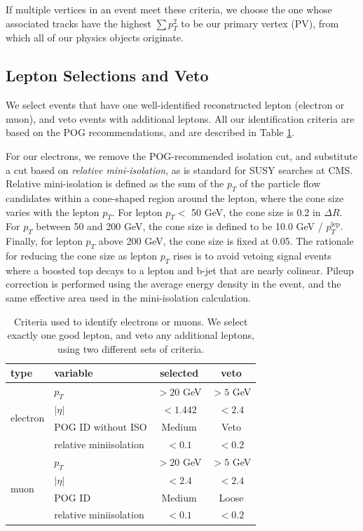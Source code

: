 If multiple vertices in an event meet these criteria, we choose the
one whose associated tracks have the highest $\sum p_T^2$ to be our
primary vertex (PV), from which all of our physics objects originate.

\subsection{Lepton Selections and Veto}
\label{ssec:stop:lepselections}

We select events that have one well-identified reconstructed lepton
(electron or muon), and veto events with additional leptons. All our
identification criteria are based on the POG recommendations, and are
described in Table \ref{tab:stop:lepselections}.

For our electrons, we remove the POG-recommended isolation cut, and
substitute a cut based on \emph{relative mini-isolation}, as is standard for
SUSY searches at CMS. Relative mini-isolation is defined as the sum of
the $p_T$ of the particle flow candidates within a cone-shaped region
around the lepton, where the cone size varies with the lepton
$p_T$. For lepton $p_T <$ 50 GeV, the cone size is 0.2 in $\Delta
R$. For $p_T$ between 50 and 200 GeV, the cone size is defined to be
10.0 GeV / $p_T^{\text{lep}}$. Finally, for lepton $p_T$ above 200 GeV, the
cone size is fixed at 0.05. The rationale for reducing the cone size
as lepton $p_T$ rises is to avoid vetoing signal events
where a boosted top decays to a lepton and b-jet that are nearly
colinear. Pileup correction is performed using the average energy
density in the event, and the same effective area used in the
mini-isolation calculation.

\begin{table}[htb]
\centering
\caption{Criteria used to identify electrons or muons. We select
  exactly one good lepton, and veto any additional leptons, using two
  different sets of criteria.}
\label{tab:stop:lepselections}
\begin{tabular}{ l | l | c | c }
\hline
type & variable & selected & veto \\ \hline
\multirow{4}{*}{electron} &    $p_T$ & $>20$ GeV & $>5$ GeV \\
 &   $|\eta|$ & $<1.442$ & $<2.4$ \\
 &   POG ID without ISO & Medium & Veto \\
 &   relative miniisolation & $<0.1$ & $<0.2$ \\
 \hline
 \multirow{4}{*}{muon} &    $p_T$ & $>20$ GeV & $>5$ GeV \\
 &   $|\eta|$ & $<2.4$ & $<2.4$ \\
 &   POG ID & Medium & Loose \\
 &   relative miniisolation & $<0.1$ & $<0.2$ \\
\hline
\end{tabular}
\end{table}

